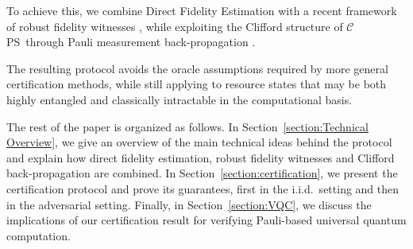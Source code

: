 \documentclass[a4paper,twocolumn,11pt,unpublished]{quantumarticle}
\newcommand{\CEPS}{$\mathcal C$PS}
\begin{document}
To achieve this, we combine Direct Fidelity Estimation \cite{FL11direct, FOS24optimal} with a recent framework of robust fidelity witnesses \cite{CGKM21efficient}, while exploiting the Clifford structure of \CEPS~through Pauli measurement back-propagation \cite{UC24efficient}. 

The resulting protocol avoids the oracle assumptions required by more general certification methods, while still applying to resource states that may be both highly entangled and classically intractable in the computational basis.

The rest of the paper is organized as follows. In Section~\ref{section:Technical Overview}, we give an overview of the main technical ideas behind the protocol and explain how direct fidelity estimation, robust fidelity witnesses and Clifford back-propagation are combined. In Section~\ref{section:certification}, we present the certification protocol and prove its guarantees, first in the i.i.d.\ setting and then in the adversarial setting. Finally, in Section~\ref{section:VQC}, we discuss the implications of our certification result for verifying Pauli-based universal quantum computation.
\end{document}
